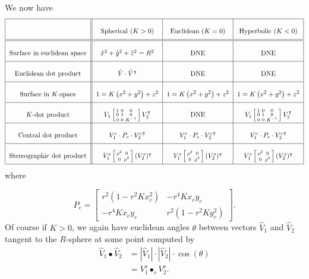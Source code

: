 \documentclass{ximera}
\begin{document}
We now have%
\[
{\renewcommand{\arraystretch}{2.5}
\begin{tabular}{|c||c|c|c|}\hline
                & Spherical ($K>0$) & Euclidean ($K=0$) & Hyperbolic ($K<0$)\\\hline\hline
Surface in euclidean space & $\hat{x}^{2}+\hat{y}^{2}+\hat{z}^{2}=R^{2}$ & DNE  & DNE \\\hline
Euclidean dot product & $\hat{V}\cdot \hat{V}^\transpose$ & DNE  & DNE\\\hline
Surface in $K$-space & $1=K\left(  x^{2}+y^{2}\right)  +z^{2}$ & $1=K\left(  x^{2}+y^{2}\right)+z^{2}$ & $1=K\left(  x^{2}+y^{2}\right)  +z^{2}$\\\hline
$K$-dot product & $V_{1}\left[\begin{smallmatrix}1 & 0 & 0\\ 0 & 1 & 0\\ 0 & 0 & K^{-1}\end{smallmatrix}\right] V_{2}^\transpose$ &  DNE & $V_{1}\left[\begin{smallmatrix}1 & 0 & 0\\ 0 & 1 & 0\\ 0 & 0 & K^{-1}\end{smallmatrix}\right]V_{2}^\transpose$\\\hline
Central dot product & 
$V_{1}^{c}\cdot  
P_c\cdot
  {V_{2}^{c}}^\transpose$ 
&
$V_{1}^{c}\cdot  
P_c\cdot
  {V_{2}^{c}}^\transpose$ 
&
$V_{1}^{c}\cdot  
P_c\cdot
  {V_{2}^{c}}^\transpose$ 
    \\\hline
Stereographic dot product & $V_{1}^{s}\left[\begin{smallmatrix}\rho^2 & 0 \\  0 & \rho^2\end{smallmatrix}\right](V_{2}^{s})^\transpose$ & 
 $V_{1}^{s}\left[\begin{smallmatrix}\rho^2 & 0 \\  0 & \rho^2\end{smallmatrix}\right](V_{2}^{s})^\transpose$ &
 $V_{1}^{s}\left[\begin{smallmatrix}\rho^2 & 0 \\  0 & \rho^2\end{smallmatrix}\right](V_{2}^{s})^\transpose$\\\hline
\end{tabular}}
\]
where

\[
P_c = \begin{bmatrix}
r^{2}\left(  1-r^{2}Kx_{c}^{2}\right)  & -r^{4}Kx_{c}y_{c}\\
-r^{4}Kx_{c}y_{c} & r^{2}\left(  1-r^{2}Ky_{c}^{2}\right)
\end{bmatrix}.
\]
Of course if $K>0$, we again have euclidean angles $\theta$ between vectors
$\hat{V}_{1}$ and $\hat{V}_{2}$ tangent to the $R$-sphere at some point
computed by%
\begin{align*}
\hat{V}_{1}\bullet\hat{V}_{2}  &  =\left\vert \hat{V}_{1}\right\vert
\cdot\left\vert \hat{V}_{2}\right\vert
\cdot\cos(\theta) \\
&=V_{1}^{s}\bullet_{s}V_{2}^{s}.
\end{align*}
\end{document}
